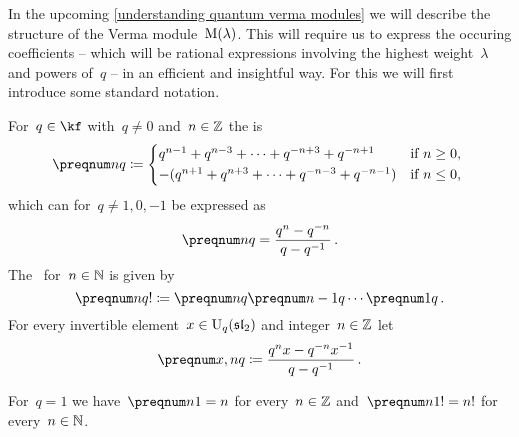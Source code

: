 \documentclass[a4paper, 11pt, oneside]{scrartcl}
\begin{document}
In the upcoming \cref{understanding quantum verma modules} we will describe the structure of the Verma module~$\operatorname{M}(\lambda)$.
This will require us to express the occuring coefficients -- which will be rational expressions involving the highest weight~$\lambda$ and powers of~$q$ -- in an efficient and insightful way.
For this we will first introduce some standard notation.

\begin{definition}
  \label{definition of quantum integers}
  For~$q \in \kf$ with~$q \neq 0$ and~$n \in \mathbb{Z}$ the  is
  \[
    \qnum{n}
    \defined
    \begin{cases*}
      q^{n-1} + q^{n-3} + \dotsb + q^{-n+3} + q^{-n+1}
      &
      if~$n \geq 0$,
      \\
      -( q^{n+1} + q^{n+3} + \dotsb + q^{-n-3} + q^{-n-1} )
      &
      if~$n \leq 0$,
    \end{cases*}
  \]
  which can for~$q \neq 1, 0, -1$ be expressed as
  \[
    \qnum{n}
    =
    \frac{q^n - q^{-n}}{q - q^{-1}} \,.
  \]
  The~ for~$n \in \mathbb{N}$ is given by
  \[
    \qnum{n}!
    \defined
    \qnum{n} \qnum{n-1} \dotsm \qnum{1} \,.
  \]
  For every invertible element~$x \in \operatorname{U}_q(\mathfrak{sl}_2)$ and integer~$n \in \mathbb{Z}$ let
  \[
    \qnum{x, n}
    \defined
    \frac{ q^n x - q^{-n} x^{-1} }{ q - q^{-1} } \,.
  \]
\end{definition}

\begin{remark}
  For~$q = 1$ we have~$\qnum{n}[1] = n$ for every~$n \in \mathbb{Z}$ and~$\qnum{n}[1]! = n!$ for every~$n \in \mathbb{N}$.
\end{remark}
\end{document}
